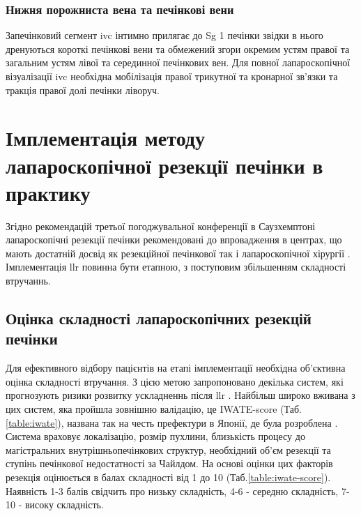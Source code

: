 \begin{refsection}
\subsubsection{Нижня порожниста вена та печінкові вени}

Запечінковий сегмент \acrshort{ivc} інтимно прилягає до Sg 1 печінки звідки в нього дренуються короткі печінкові вени та обмежений згори окремим устям правої та загальним устям лівої та серединної печінкових вен. Для повної лапароскопічної візуалізації \acrshort{ivc} необхідна мобілізація правої трикутної та кронарної зв'язки та тракція правої долі печінки ліворуч.

\section{Імплементація методу лапароскопічної резекції печінки в практику}

Згідно рекомендацій третьої погоджувальної конференції в Саузхемптоні лапароскопічні резекції печінки рекомендовані до впровадження в центрах, що мають достатній досвід як резекційної печінкової так і лапароскопічної хірургії \cite{AbuHilal2017a}. Імплементація \acrshort{llr} повинна бути етапною, з поступовим збільшенням складності втручаннь. 

\subsection{Оцінка складності лапароскопічних резекцій печінки}
Для ефективного відбору пацієнтів на етапі імплементації необхідна об'єк\-тивна оцінка складності втручання. З цією метою запропоновано декілька систем, які прогнозують ризики розвитку ускладненнь після \acrshort{llr} \cite{Kawaguchi2018, Hasegawa2017a}. Найбільш широко вживана з цих систем, яка пройшла зовнішню валідацію, це IWATE-score (Таб.\ref{table:iwate}), названа так на честь префектури в Японії, де була розроблена \cite{Ban2014}. Система враховує локалізацію, розмір пухлини, близькість процесу до магістральних внутрішньопечінкових структур, необхідний об'єм резекції та  ступінь печінкової недостатності за Чайлдом. На основі оцінки цих факторів резекція оцінюється в балах складності від 1 до 10 (Таб.\ref{table:iwate-score}). Наявність 1-3 балів свідчить про низьку складність, 4-6 - середню складність, 7-10 - високу складність. 


\end{refsection}
